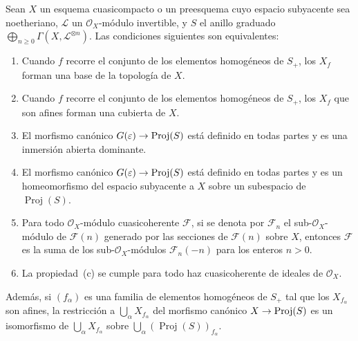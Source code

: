 \documentclass[oneside,10pt]{amsart}
\makeatletter
\renewcommand{\geq}{\geqslant}
\newcommand{\ega@arrow}[2]{\mathchoice{#1}{#2}{#2}{#2}}
\renewcommand{\to}{\ega@arrow{\longrightarrow}{\rightarrow}}
\newcommand{\oldpage}[2][]{\marginnote{\normalfont\footnotesize\textbf{#1}~|~#2}\ignorespaces}
\let\EGAOriginalLabel\label
\renewcommand{\label}[1]{\phantomsection\EGAOriginalLabel{#1}}
\makeatother
\begin{document}
\begin{theorem}[4.5.2]
\label{II.4.5.2-fr}
Sean $X$ un esquema cuasicompacto o un preesquema cuyo espacio subyacente sea noetheriano, $\mathcal{L}$ un $\mathcal{O}_X$-módulo invertible, y $S$ el anillo graduado $\bigoplus_{n\geq0}\Gamma(X,\mathcal{L}^{\otimes n})$.
Las condiciones siguientes son equivalentes:
\begin{enumerate}
  \item[\rm{(a)}] Cuando $f$ recorre el conjunto de los elementos homogéneos de $S_+$, los $X_f$ forman una base de la topología de $X$.
  \item[\rm{(a')}] Cuando $f$ recorre el conjunto de los elementos homogéneos de $S_+$, los $X_f$ que son afines forman una cubierta de $X$.
  \item[\rm{(b)}] El morfismo canónico $G(\varepsilon)\to\operatorname{Proj}(S)$  está definido en todas partes y es una inmersión abierta dominante.
\oldpage[II]{84}
  \item[\rm{(b')}] El morfismo canónico $G(\varepsilon)\to\operatorname{Proj}(S)$ está definido en todas partes y es un homeomorfismo del espacio subyacente a $X$ sobre un subespacio de $\operatorname{Proj}(S)$.
  \item[\rm{(c)}] Para todo $\mathcal{O}_X$-módulo cuasicoherente $\mathcal{F}$, si se denota por $\mathcal{F}_n$ el sub-$\mathcal{O}_X$-módulo de $\mathcal{F}(n)$ generado por las secciones de $\mathcal{F}(n)$ sobre $X$, entonces $\mathcal{F}$ es la suma de los sub-$\mathcal{O}_X$-módulos $\mathcal{F}_n(-n)$ para los enteros $n>0$.
  \item[\rm{(c')}] La propiedad~\rm{(c)} se cumple para todo haz cuasicoherente de ideales de $\mathcal{O}_X$.
\end{enumerate}

Además, si $(f_\alpha)$ es una familia de elementos homogéneos de $S_+$ tal que los $X_{f_\alpha}$ son afines, la restricción a $\bigcup_\alpha X_{f_\alpha}$ del morfismo canónico $X\to\operatorname{Proj}(S)$ es un isomorfismo de $\bigcup_\alpha X_{f_\alpha}$ sobre $\bigcup_\alpha(\operatorname{Proj}(S))_{f_\alpha}$.
\end{theorem}
\end{document}
